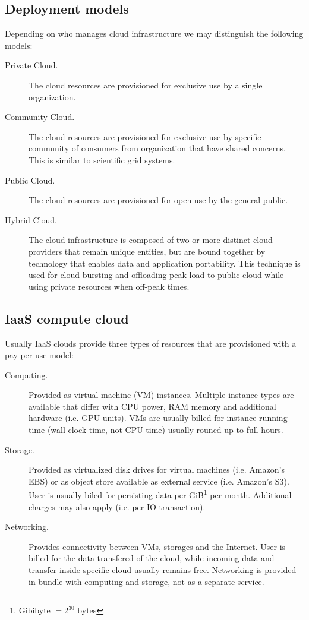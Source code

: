 \subsection{Deployment models}

Depending on who manages cloud infrastructure we may distinguish the following models:

\begin{description}
  \item[Private Cloud.] The cloud resources are provisioned for exclusive use by a single organization.
  \item[Community Cloud.] The cloud resources are provisioned for exclusive use by specific community of consumers from organization that have shared concerns. This is similar to scientific grid systems.
  \item[Public Cloud.] The cloud resources are provisioned for open use by the general public.
  \item[Hybrid Cloud.] The cloud infrastructure is composed of two or more distinct cloud providers that remain unique entities, but are bound together by technology that enables data and application portability. This technique is used for cloud bursting and offloading peak load to public cloud while using private resources when off-peak times.
\end{description}

\subsection{IaaS compute cloud}

Usually IaaS clouds provide three types of resources that are provisioned with a pay-per-use model: 
\begin{description}
  \item[Computing.] Provided as virtual machine (VM) instances. Multiple instance types are available that differ with CPU power, RAM memory and additional hardware (i.e. GPU units). VMs are usually billed for instance running time (wall clock time, not CPU time) usually rouned up to full hours.
  \item[Storage.] Provided as virtualized disk drives for virtual machines (i.e. Amazon's EBS) or as object store available as external service (i.e. Amazon's S3). User is usually biled for persisting data per GiB\footnote{Gibibyte $= 2^{30}$ bytes} per month. Additional charges may also apply (i.e. per IO transaction).
  \item[Networking.] Provides connectivity between VMs, storages and the Internet. User is billed for the data transfered of the cloud, while incoming data and transfer inside specific cloud usually remains free. Networking is provided in bundle with computing and storage, not as a separate service.
\end{description}

